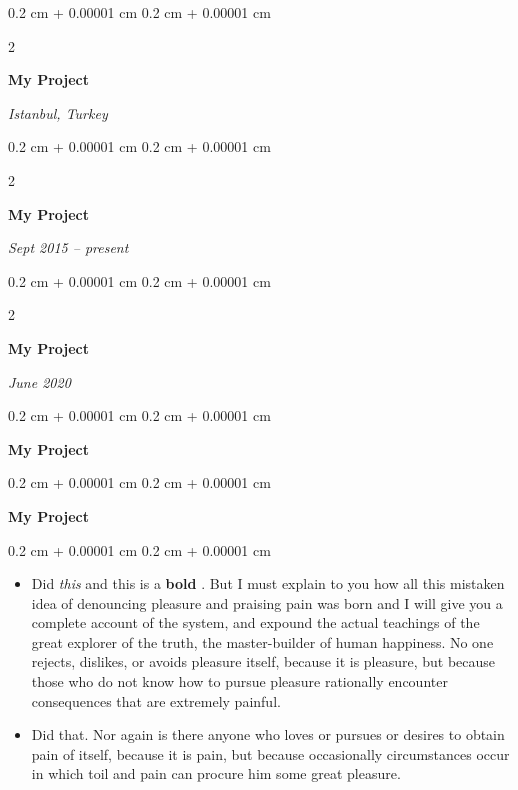 \documentclass[10pt, letterpaper]{article}
\newenvironment{highlights}{
    \begin{itemize}[
        topsep=0.10 cm,
        parsep=0.10 cm,
        partopsep=0pt,
        itemsep=0pt,
        leftmargin=0.4 cm + 10pt
    ]
}{
    \end{itemize}
} %
\newenvironment{onecolentry}{
    \begin{adjustwidth}{
        0.2 cm + 0.00001 cm
    }{
        0.2 cm + 0.00001 cm
    }
}{
    \end{adjustwidth}
} %
\newenvironment{twocolentry}[2][]{
    \onecolentry
    \def\secondColumn{#2}
    \setcolumnwidth{\fill, 4.5 cm}
    \begin{paracol}{2}
}{
    \switchcolumn \raggedleft \secondColumn
    \end{paracol}
    \endonecolentry
} %
\let\hrefWithoutArrow\href
\renewcommand{\href}[2]{\hrefWithoutArrow{#1}{\ifthenelse{\equal{#2}{}}{ }{#2 }\raisebox{.15ex}{\footnotesize \faExternalLink*}}}
\begin{document}
        \vspace{0.2 cm}

        \begin{twocolentry}{
        \textit{Istanbul, Turkey}    
            
        }
            \textbf{My Project}
        \end{twocolentry}



        \vspace{0.2 cm}

        \begin{twocolentry}{
            
            
        \textit{Sept 2015 – present}}
            \textbf{My Project}
        \end{twocolentry}



        \vspace{0.2 cm}

        \begin{twocolentry}{
            
            
        \textit{June 2020}}
            \textbf{My Project}
        \end{twocolentry}



        \vspace{0.2 cm}

        \begin{onecolentry}
            \textbf{My Project}
        \end{onecolentry}



        \vspace{0.2 cm}

        \begin{onecolentry}
            \textbf{My Project}
        \end{onecolentry}

        \vspace{0.10 cm}
        \begin{onecolentry}
            \begin{highlights}
                \item Did \textit{this} and this is a \textbf{bold} \href{https://example.com}{link}. But I must explain to you how all this mistaken idea of denouncing pleasure and praising pain was born and I will give you a complete account of the system, and expound the actual teachings of the great explorer of the truth, the master-builder of human happiness. No one rejects, dislikes, or avoids pleasure itself, because it is pleasure, but because those who do not know how to pursue pleasure rationally encounter consequences that are extremely painful.
                \item Did that. Nor again is there anyone who loves or pursues or desires to obtain pain of itself, because it is pain, but because occasionally circumstances occur in which toil and pain can procure him some great pleasure.
            \end{highlights}
        \end{onecolentry}
\end{document}
